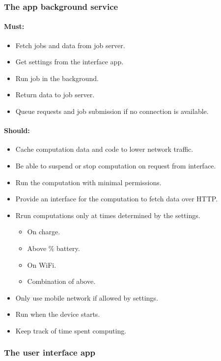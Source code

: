 \documentclass[a4paper,10pt]{article}
\begin{document}
\subsubsection{The app background service}

\paragraph{Must:}

\begin{itemize}
\item Fetch jobs and data from job server.
\item Get settings from the interface app.
\item Run job in the background.
\item Return data to job server.
\item Queue requests and job submission if no connection is available.
\end{itemize}

\paragraph{Should:}

\begin{itemize}
\item Cache computation data and code to lower network traffic.
\item Be able to suspend or stop computation on request from interface.
\item Run the computation with minimal permissions.
\item Provide an interface for the computation to fetch data over HTTP.
\item Rrun computations only at times determined by the settings.
\begin{itemize}
\item On charge.
\item Above \% battery.
\item On WiFi.
\item Combination of above.
\end{itemize}
\item Only use mobile network if allowed by settings.
\item Run when the device starts.
\item Keep track of time spent computing.
\end{itemize}

\subsubsection{The user interface app}
\end{document}
